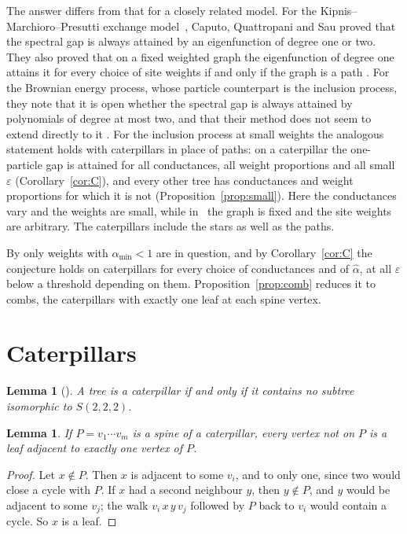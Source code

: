 \documentclass[11pt]{article}
\newtheorem{lemma}[theorem]{Lemma}
\theoremstyle{remark}
\newcommand{\eps}{\varepsilon}
\begin{document}
The answer differs from that for a closely related model. For the Kipnis--Marchioro--Presutti exchange model~\cite{KMP82}, Caputo, Quattropani and Sau proved that the spectral gap is always attained by an eigenfunction of degree one or two. They also proved that on a fixed weighted graph the eigenfunction of degree one attains it for every choice of site weights if and only if the graph is a path \cite[Theorem~1.6 and Remark~1.7]{CQS26}. For the Brownian energy process, whose particle counterpart is the inclusion process, they note that it is open whether the spectral gap is always attained by polynomials of degree at most two, and that their method does not seem to extend directly to it \cite[Section~1.4.6]{CQS26}. For the inclusion process at small weights the analogous statement holds with caterpillars in place of paths: on a caterpillar the one-particle gap is attained for all conductances, all weight proportions and all small $\eps$ (Corollary~\ref{cor:C}), and every other tree has conductances and weight proportions for which it is not (Proposition~\ref{prop:small}). Here the conductances vary and the weights are small, while in~\cite{CQS26} the graph is fixed and the site weights are arbitrary. The caterpillars include the stars as well as the paths.

By \cite{KS24} only weights with $\alpha_{\min}<1$ are in question, and by Corollary~\ref{cor:C} the conjecture holds on caterpillars for every choice of conductances and of $\hat\alpha$, at all $\eps$ below a threshold depending on them. Proposition~\ref{prop:comb} reduces it to combs, the caterpillars with exactly one leaf at each spine vertex.

\section{Caterpillars}\label{sec:cat}

\begin{lemma}[\cite{HS71}]\label{lem:cat}
A tree is a caterpillar if and only if it contains no subtree isomorphic to $S(2,2,2)$.
\end{lemma}

\begin{lemma}\label{lem:spine}
If $P=v_1\cdots v_m$ is a spine of a caterpillar, every vertex not on $P$ is a leaf adjacent to exactly one vertex of $P$.
\end{lemma}

\begin{proof}
Let $x\notin P$. Then $x$ is adjacent to some $v_i$, and to only one, since two would close a cycle with $P$. If $x$ had a second neighbour $y$, then $y\notin P$, and $y$ would be adjacent to some $v_j$; the walk $v_i\,x\,y\,v_j$ followed by $P$ back to $v_i$ would contain a cycle. So $x$ is a leaf.
\end{proof}
\end{document}
